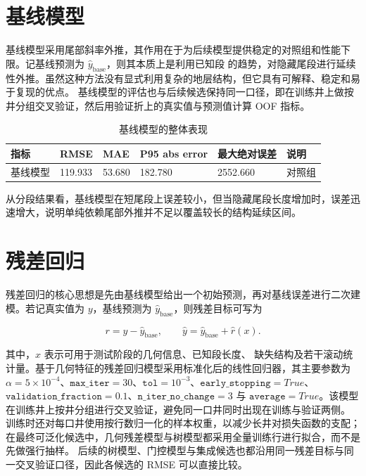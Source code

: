 \documentclass[openany]{Template_ECNU_Undergraduate_202505/ecnuundergraduate}
\newcommand{\cvtab}[1]{\path{#1}}
\begin{document}
\section{基线模型}
基线模型采用尾部斜率外推，其作用在于为后续模型提供稳定的对照组和性能下限。记基线预测为 \(\hat y_{\mathrm{base}}\)，则其本质上是利用已知段 \cvtab{TVT\_input} 的趋势，对隐藏尾段进行延续性外推。虽然这种方法没有显式利用复杂的地层结构，但它具有可解释、稳定和易于复现的优点。
基线模型的评估也与后续候选保持同一口径，即在训练井上做按井分组交叉验证，然后用验证折上的真实值与预测值计算 OOF 指标。

\begin{table}[H]
\centering
\small
\begin{tabular}{@{}p{3.5cm}p{1.9cm}p{1.7cm}p{1.7cm}p{1.9cm}p{1.9cm}@{}}
\toprule
指标 & RMSE & MAE & P95 abs error & 最大绝对误差 & 说明 \\
\midrule
基线模型 & 119.933 & 53.680 & 182.780 & 2552.660 & 对照组 \\
\bottomrule
\end{tabular}
\caption{基线模型的整体表现}
\end{table}

从分段结果看，基线模型在短尾段上误差较小，但当隐藏尾段长度增加时，误差迅速增大，说明单纯依赖尾部外推并不足以覆盖较长的结构延续区间。

\section{残差回归}
残差回归的核心思想是先由基线模型给出一个初始预测，再对基线误差进行二次建模。若记真实值为 \(y\)，基线预测为 \(\hat y_{\mathrm{base}}\)，则残差目标可写为

\[
r = y - \hat y_{\mathrm{base}},
\qquad
\hat y = \hat y_{\mathrm{base}} + \hat r(x).
\]

其中，\(x\) 表示可用于测试阶段的几何信息、已知段长度、\cvtab{GR} 缺失结构及若干滚动统计量。基于几何特征的残差回归模型采用标准化后的线性回归器，其主要参数为 \(\alpha=5\times10^{-4}\)、\(\texttt{max\_iter}=30\)、\(\texttt{tol}=10^{-3}\)、\(\texttt{early\_stopping}=True\)、\(\texttt{validation\_fraction}=0.1\)、\(\texttt{n\_iter\_no\_change}=3\) 与 \(\texttt{average}=True\)。该模型在训练井上按井分组进行交叉验证，避免同一口井同时出现在训练与验证两侧。
训练时还对每口井使用按行数归一化的样本权重，以减少长井对损失函数的支配；在最终可泛化候选中，几何残差模型与树模型都采用全量训练行进行拟合，而不是先做强行抽样。
后续的树模型、门控模型与集成候选也都沿用同一残差目标与同一交叉验证口径，因此各候选的 RMSE 可以直接比较。
\end{document}
